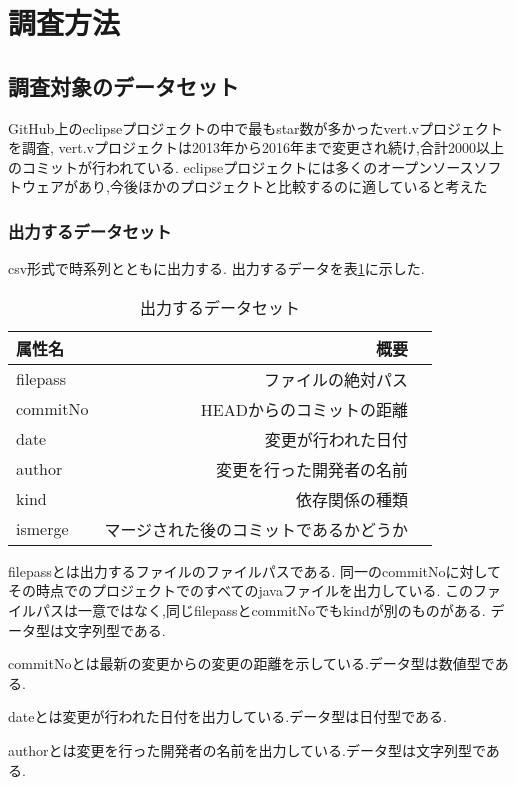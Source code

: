 \documentclass{fose2016}           %
\begin{document}
\section{調査方法}\label{調査方法}


\subsection{調査対象のデータセット}
GitHub上のeclipseプロジェクトの中で最もstar数が多かったvert.vプロジェクトを調査,
vert.vプロジェクトは2013年から2016年まで変更され続け,合計2000以上のコミットが行われている.
eclipseプロジェクトには多くのオープンソースソフトウェアがあり,今後ほかのプロジェクトと比較するのに適していると考えた


\subsubsection{出力するデータセット}
csv形式で時系列とともに出力する.
出力するデータを表\ref{tab:初期データセット}に示した.


\begin{table}[htb]
\caption{出力するデータセット}
\begin{tabular}{|l|r|r|} \hline
属性名 & 概要 \\ \hline
filepass & ファイルの絶対パス \\ \hline
commitNo & HEADからのコミットの距離 \\ \hline
date & 変更が行われた日付 \\ \hline
author & 変更を行った開発者の名前 \\ \hline
kind & 依存関係の種類 \\ \hline
ismerge & マージされた後のコミットであるかどうか \\ \hline
\end{tabular}
\label{tab:初期データセット}
\end{table}

filepassとは出力するファイルのファイルパスである.
同一のcommitNoに対してその時点でのプロジェクトでのすべてのjavaファイルを出力している.
このファイルパスは一意ではなく,同じfilepassとcommitNoでもkindが別のものがある.
データ型は文字列型である.

commitNoとは最新の変更からの変更の距離を示している.データ型は数値型である.

dateとは変更が行われた日付を出力している.データ型は日付型である.

authorとは変更を行った開発者の名前を出力している.データ型は文字列型である.
\end{document}
